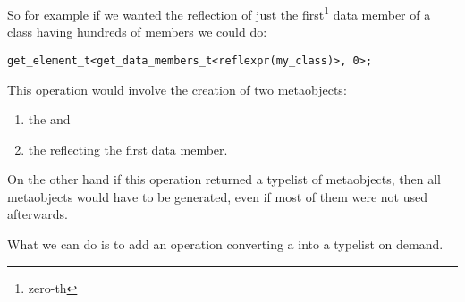 So for example if we wanted the reflection of just the first\footnote
{zero-th} data member of a class having hundreds of members we could do:

\begin{verbatim}
get_element_t<get_data_members_t<reflexpr(my_class)>, 0>;
\end{verbatim}

This operation would involve the creation of two metaobjects:
\begin{enumerate}
	\item the  and
	\item the  reflecting the first data member.
\end{enumerate}

On the other hand if this operation returned a typelist of metaobjects,
then all metaobjects would have to be generated, even if most of them
were not used afterwards.

What we can do is to add an operation converting a 
into a typelist on demand.

